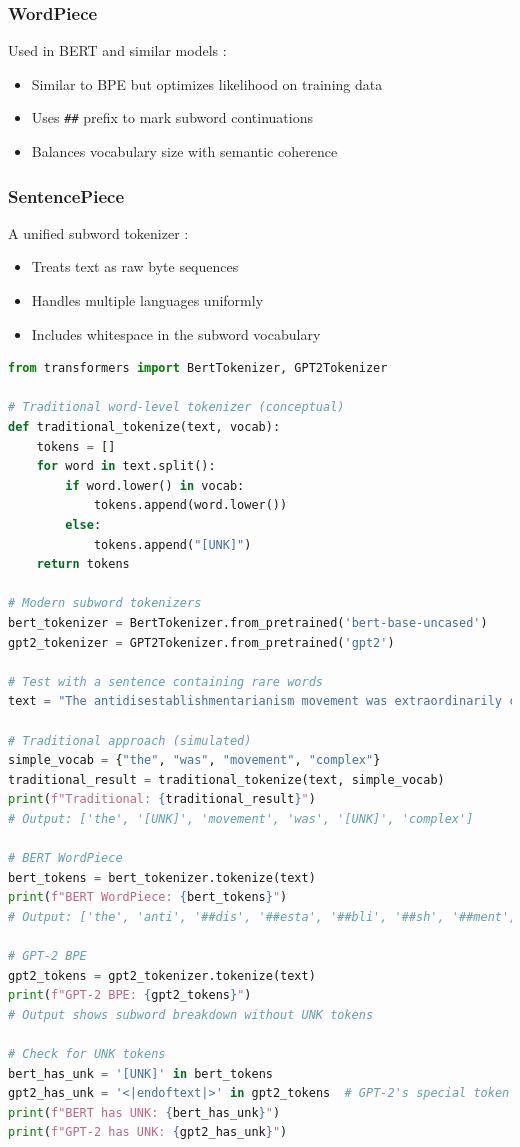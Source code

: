 \subsubsection{WordPiece}
Used in BERT and similar models \citep{schuster2012japanese, devlin2018bert}:
\begin{itemize}
\item Similar to BPE but optimizes likelihood on training data
\item Uses \texttt{\#\#} prefix to mark subword continuations
\item Balances vocabulary size with semantic coherence
\end{itemize}

\subsubsection{SentencePiece}
A unified subword tokenizer \citep{kudo2018subword}:
\begin{itemize}
\item Treats text as raw byte sequences
\item Handles multiple languages uniformly
\item Includes whitespace in the subword vocabulary
\end{itemize}

\begin{lstlisting}[language=Python, caption=Subword vs Traditional Tokenization]
from transformers import BertTokenizer, GPT2Tokenizer

# Traditional word-level tokenizer (conceptual)
def traditional_tokenize(text, vocab):
    tokens = []
    for word in text.split():
        if word.lower() in vocab:
            tokens.append(word.lower())
        else:
            tokens.append("[UNK]")
    return tokens

# Modern subword tokenizers
bert_tokenizer = BertTokenizer.from_pretrained('bert-base-uncased')
gpt2_tokenizer = GPT2Tokenizer.from_pretrained('gpt2')

# Test with a sentence containing rare words
text = "The antidisestablishmentarianism movement was extraordinarily complex"

# Traditional approach (simulated)
simple_vocab = {"the", "was", "movement", "complex"}
traditional_result = traditional_tokenize(text, simple_vocab)
print(f"Traditional: {traditional_result}")
# Output: ['the', '[UNK]', 'movement', 'was', '[UNK]', 'complex']

# BERT WordPiece
bert_tokens = bert_tokenizer.tokenize(text)
print(f"BERT WordPiece: {bert_tokens}")
# Output: ['the', 'anti', '##dis', '##esta', '##bli', '##sh', '##ment', '##arian', '##ism', 'movement', 'was', 'extraordinary', 'complex']

# GPT-2 BPE
gpt2_tokens = gpt2_tokenizer.tokenize(text)
print(f"GPT-2 BPE: {gpt2_tokens}")
# Output shows subword breakdown without UNK tokens

# Check for UNK tokens
bert_has_unk = '[UNK]' in bert_tokens
gpt2_has_unk = '<|endoftext|>' in gpt2_tokens  # GPT-2's special token
print(f"BERT has UNK: {bert_has_unk}")
print(f"GPT-2 has UNK: {gpt2_has_unk}")
\end{lstlisting}

